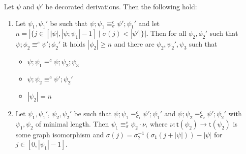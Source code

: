 \documentclass[conference]{IEEEtran}
\newcommand{\interval}[2][1]{\ensuremath{[{#1},{#2}]}}
\newcommand{\perm}{\sigma}
\newcommand{\target}[1]{\ensuremath{\mathsf{t}({#1})}}
\begin{document}
\begin{lemma}
  \label{le:prop-c}
  Let $\psi$ and $\psi'$ be decorated derivations. Then the following hold:
  \begin{enumerate}
  \item
    \label{le:prop-c:1}
    Let $\psi_1, \psi_1'$ be such
    that $\psi;\psi_1 \equiv^c_{\perm} \psi';\psi_1'$ and let
    $n = | \{ j \in \interval[|\psi|]{|\psi;\psi_1|-1} \mid \perm(j)
    < |\psi'| \}|$. Then for all $\phi_2, \phi_2'$ such that
    $\psi;\phi_2 \equiv^c \psi';\phi_2'$ it holds $|\phi_2| \geq n$
    and there are $\psi_2, \psi_2',\psi_3$ such that

    \begin{itemize}
    \item $\psi;\psi_1 \equiv^c \psi;\psi_2;\psi_3$
    \item $\psi;\psi_2 \equiv^c \psi';\psi_2'$
      
    \item $|\psi_2| = n$
    
    \end{itemize}

  \item
    \label{le:prop-c:2}
    Let $\psi_1, \psi_1'$, $\psi_2, \psi_2'$ be such that
    $\psi;\psi_1 \equiv^c_{\perm_1} \psi';\psi_1'$ and
    $\psi;\psi_2 \equiv^c_{\perm_2} \psi';\psi_2'$ with $\psi_1, \psi_2$
    of minimal length. Then $\psi_1 \equiv^c_\perm \psi_2 \cdot \nu$,
    where $\nu : \target{\psi_2} \to \target{\psi_2}$ is some graph isomorphism and
    $\perm(j) = \perm_2^{-1}(\perm_1(j + |\psi|))-|\psi|$ for
    $j \in \interval[0]{|\psi_1|-1}$.    
  \end{enumerate}
\end{lemma}  
\end{document}
